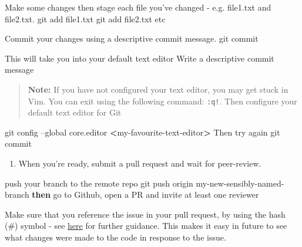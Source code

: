 \documentclass[]{book}
\newenvironment{Shaded}{\begin{snugshade}}{\end{snugshade}}
\newcommand{\ExtensionTok}[1]{#1}
\newcommand{\FunctionTok}[1]{\textcolor[rgb]{0.00,0.00,0.00}{#1}}
\newcommand{\KeywordTok}[1]{\textcolor[rgb]{0.13,0.29,0.53}{\textbf{#1}}}
\newcommand{\NormalTok}[1]{#1}
\newcommand{\OperatorTok}[1]{\textcolor[rgb]{0.81,0.36,0.00}{\textbf{#1}}}
\newcommand{\StringTok}[1]{\textcolor[rgb]{0.31,0.60,0.02}{#1}}
\providecommand{\tightlist}{%
  \setlength{\itemsep}{0pt}\setlength{\parskip}{0pt}}
\begin{document}
\begin{Shaded}
\begin{Highlighting}[]
\ExtensionTok{Make}\NormalTok{ some changes then stage each file you}\StringTok{'ve changed - e.g. file1.txt and file2.txt.}
\StringTok{git add file1.txt}
\StringTok{git add file2.txt}
\StringTok{etc}

\StringTok{Commit your changes using a descriptive commit message.}
\StringTok{git commit}

\StringTok{This will take you into your default text editor}
\StringTok{Write a descriptive commit message}
\end{Highlighting}
\end{Shaded}

\begin{quote}
\textbf{Note:}
If you have not configured your text editor, you may get stuck in Vim. You can exit using the following command: \texttt{:q!}. Then configure your default text editor for Git
\end{quote}

\begin{Shaded}
\begin{Highlighting}[]
\FunctionTok{git}\NormalTok{ config --global core.editor }\OperatorTok{<}\NormalTok{my-favourite-text-editor}\OperatorTok{>}
 \ExtensionTok{Then}\NormalTok{ try again}
\FunctionTok{git}\NormalTok{ commit}
\end{Highlighting}
\end{Shaded}

\begin{enumerate}
\def\labelenumi{\arabic{enumi}.}
\setcounter{enumi}{4}
\tightlist
\item
  When you're ready, submit a pull request and wait for peer-review.
\end{enumerate}

\begin{Shaded}
\begin{Highlighting}[]
\ExtensionTok{push}\NormalTok{ your branch to the remote repo}
\FunctionTok{git}\NormalTok{ push origin my-new-sensibly-named-branch}
\KeywordTok{then} \ExtensionTok{go}\NormalTok{ to Github, open a PR and invite at least one reviewer}
\end{Highlighting}
\end{Shaded}

Make sure that you reference the issue in your pull request, by using the hash (\#) symbol - see \href{https://help.github.com/articles/autolinked-references-and-urls/}{here} for further guidance. This makes it easy in future to see what changes were made to the code in response to the issue.
\end{document}
